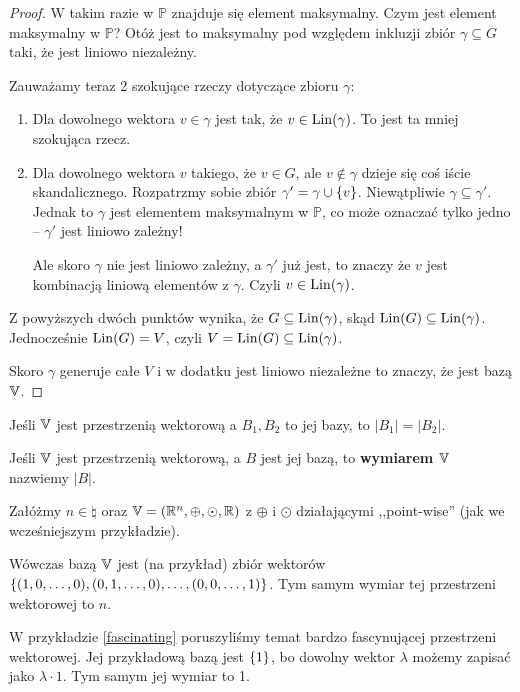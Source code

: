 \begin{proof}
	W takim razie w \(\mathbb{P}\) znajduje się element maksymalny. Czym jest element maksymalny w \(\mathbb{P}\)? Otóż jest to maksymalny pod względem inkluzji zbiór \(\gamma \subseteq G\) taki, że jest liniowo niezależny.

	Zauważamy teraz 2 szokujące rzeczy dotyczące zbioru \( \gamma \):

	\begin{enumerate}
		\item Dla dowolnego wektora \( v \in \gamma\) jest tak, że \( v \in {\mathrm{Lin}}(\gamma)\). To jest ta mniej szokująca rzecz.
		\item Dla dowolnego wektora \(v\) takiego, że \(v \in G\), ale \( v \not \in \gamma\) dzieje się coś iście skandalicznego. Rozpatrzmy sobie zbiór \( \gamma' = \gamma \cup \set {v} \). Niewątpliwie \(\gamma \subseteq \gamma'\). Jednak to \(\gamma\) jest elementem maksymalnym w \(\mathbb{P}\), co może oznaczać tylko jedno -- \(\gamma'\) jest liniowo zależny!

		      Ale skoro \(\gamma\) nie jest liniowo zależny, a \(\gamma'\) już jest, to znaczy że \(v\) jest kombinacją liniową elementów z \(\gamma\). Czyli \( v \in {\mathrm{Lin}}(\gamma)\).
	\end{enumerate}

	Z powyższych dwóch punktów wynika, że \(G \subseteq {\mathrm{Lin}}(\gamma)\), skąd \({\mathrm{Lin}}(G) \subseteq {\mathrm{Lin}}(\gamma)\). Jednocześnie \({\mathrm{Lin}}(G) = V\), czyli \(V = {\mathrm{Lin}}(G) \subseteq {\mathrm{Lin}}(\gamma)\).

	Skoro \(\gamma\) generuje całe \(V\) i w dodatku jest liniowo niezależne to znaczy, że jest bazą \(\mathbb{V}\).
\end{proof}

\begin{fact}
	Jeśli \(\mathbb{V}\) jest przestrzenią wektorową a \(B_1, B_2\) to jej bazy, to \(|B_1| = |B_2|\).
\end{fact}

\begin{definition}
	Jeśli \(\mathbb{V}\) jest przestrzenią wektorową, a \(B\) jest jej bazą, to \textbf{wymiarem \(\mathbb{V}\)} nazwiemy \(|B|\).
\end{definition}


\begin{example}
	Załóżmy \(n \in \natural\) oraz \(\mathbb{V} = (\mathbb{R}^{n}, \oplus, \odot, \mathbb{R})\) z \(\oplus\) i \(\odot\) działającymi ,,point-wise'' (jak we wcześniejszym przykładzie).

	Wówczas bazą \(\mathbb{V}\) jest (na przykład) zbiór wektorów \(\set{(1, 0, \dots, 0), (0, 1, \dots, 0), \dots, (0, 0, \dots, 1)}\). Tym samym wymiar tej przestrzeni wektorowej to \(n\).
\end{example}

\begin{example}
	W przykładzie \ref{fascinating} poruszyliśmy temat bardzo fascynującej przestrzeni wektorowej. Jej przykładową bazą jest \(\set{1}\), bo dowolny wektor \(\lambda\) możemy zapisać jako \(\lambda \cdot 1\). Tym samym jej wymiar to 1.
\end{example}
